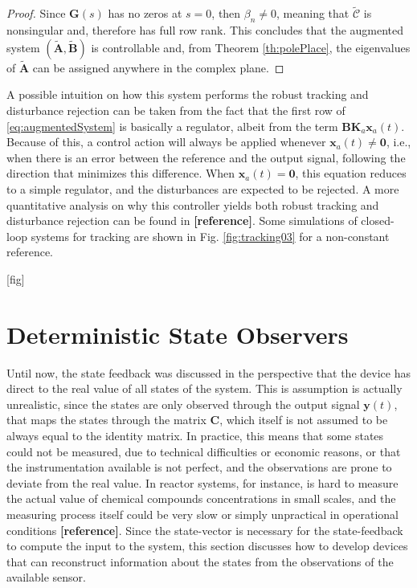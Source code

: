 \documentclass[a4paper,11pt]{book}
\numberwithin{figure}{chapter}
\numberwithin{equation}{chapter}
\numberwithin{table}{chapter}
\theoremstyle{definition}
\begin{document}
\begin{proof}
	Since $\bm{G}(s)$ has no zeros at $s = 0$, then $\beta_n \neq 0$, meaning that $\tilde{\bm{\mathcal{C}}}$ is nonsingular and, therefore has full row rank. This concludes that the augmented system $(\tilde{\bm{A}}, \tilde{\bm{B}})$ is controllable and, from Theorem \ref{th:polePlace}, the eigenvalues of $\tilde{\bm{A}}$ can be assigned anywhere in the complex plane.
\end{proof}

A possible intuition on how this system performs the robust tracking and disturbance rejection can be taken from the fact that the first row of \eqref{eq:augmentedSystem} is basically a regulator, albeit from the term $\bm{B} \bm{K}_a \bm{x}_a(t)$. Because of this, a control action will always be applied whenever $\bm{x}_a(t) \neq \bm{0}$, i.e., when there is an error between the reference and the output signal, following the direction that minimizes this difference. When $\bm{x}_a(t) = \bm{0}$, this equation reduces to a simple regulator, and the disturbances are expected to be rejected. A more quantitative analysis on why this controller yields both robust tracking and disturbance rejection can be found in \textbf{[reference]}. Some simulations of closed-loop systems for tracking are shown in Fig. \ref{fig:tracking03} for a non-constant reference.

[fig]


\section{Deterministic State Observers}

Until now, the state feedback was discussed in the perspective that the device has direct to the real value of all states of the system. This is assumption is actually unrealistic, since the states are only observed through the output signal $\bm{y}(t)$, that maps the states through the matrix $\bm{C}$, which itself is not assumed to be always equal to the identity matrix. In practice, this means that some states could not be measured, due to technical difficulties or economic reasons, or that the instrumentation available is not perfect, and the observations are prone to deviate from the real value. In reactor systems, for instance, is hard to measure the actual value of chemical compounds concentrations in small scales, and the measuring process itself could be very slow or simply unpractical in operational conditions \textbf{[reference]}. Since the state-vector is necessary for the state-feedback to compute the input to the system, this section discusses how to develop devices that can reconstruct information about the states from the observations of the available sensor.
\end{document}
